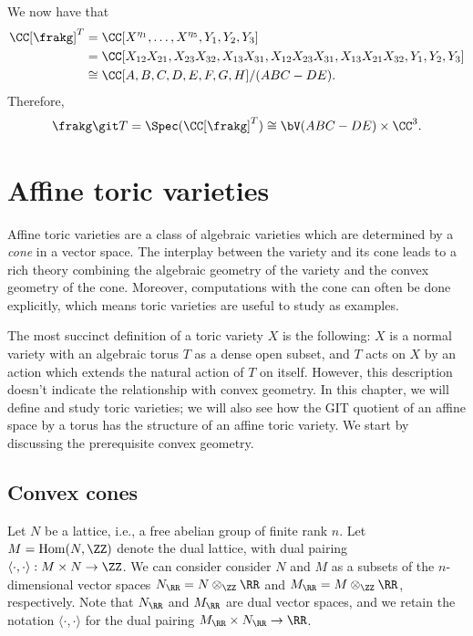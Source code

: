 \documentclass[12pt]{amsart}
\theoremstyle{plain}
\begin{document}
We now have that
\begin{align*}
	\CC[\frakg]^T &= \CC[X^{\eta_1}, \ldots, X^{\eta_5}, Y_1, Y_2, Y_3] \\
	&= \CC[X_{12} X_{21}, X_{23} X_{32}, X_{13} X_{31}, X_{12} X_{23} X_{31}, X_{13} X_{21} X_{32}, Y_1, Y_2, Y_3] \\
	&\cong \CC[A, B, C, D, E, F, G, H]/(ABC - DE).
\end{align*}
Therefore,
$$\frakg \git T = \Spec(\CC[\frakg]^T) \cong \bV(ABC - DE ) \times \CC^3.$$


\newpage
\section{Affine toric varieties}
Affine toric varieties are a class of algebraic varieties which are determined by a \emph{cone} in a vector space.
The interplay between the variety and its cone leads to a rich theory combining the algebraic geometry of the variety and the convex geometry of the cone.
Moreover, computations with the cone can often be done explicitly, which means toric varieties are useful to study as examples.

The most succinct definition of a toric variety $X$ is the following:
$X$ is a normal variety with an algebraic torus $T$ as a dense open subset, and $T$ acts on $X$ by an action which extends the natural action of $T$ on itself.
However, this description doesn't indicate the relationship with convex geometry.
In this chapter, we will define and study toric varieties; we will also see how the GIT quotient of an affine space by a torus has the structure of an affine toric variety.
We start by discussing the prerequisite convex geometry.

\subsection{Convex cones}
Let $N$ be a lattice, i.e., a free abelian group of finite rank $n$.
Let $M = \mathrm{Hom}(N, \ZZ)$ denote the dual lattice, with dual pairing $\langle \cdot, \cdot \rangle : M \times N \to \ZZ$.
We can consider consider $N$ and $M$ as a subsets of the $n$-dimensional vector spaces
$N_\RR = N \otimes_\ZZ \RR$ and $M_\RR = M \otimes_\ZZ \RR$, respectively.
Note that $N_\RR$ and $M_\RR$ are dual vector spaces, and we retain the notation $\langle \cdot, \cdot \rangle$ for the dual pairing $M_\RR \times N_\RR \to \RR$.
\end{document}
